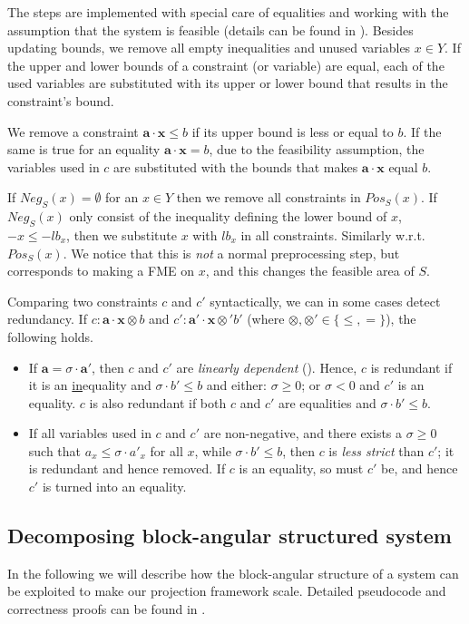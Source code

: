 \documentclass{llncs}
\newcommand{\Pos}{\mathit{Pos}}
\newcommand{\Neg}{\mathit{Neg}}
\newcommand{\ve}{\mathbf}
\newcounter{counterName}
\begin{document}
The steps are implemented with special care of equalities and working with the assumption that the system is feasible (details can be found in \cite{MyTechRep}).
Besides updating bounds, we remove all empty inequalities and unused variables $x\in Y$.  
%
If the upper and lower bounds of a constraint (or variable) are equal, each of the used variables are substituted with its upper or lower bound that results in the constraint's bound. 

%
We remove a constraint $\ve{a}\cdot \ve{x} \leq b$ if its upper bound 
is less or equal to $b$. 
If the same is true for an equality $\ve{a}\cdot \ve{x}=b$, due to the feasibility assumption, the variables used in $c$ are substituted with the bounds that makes $\ve{a}\cdot \ve{x}$ equal $b$. 


If $\Neg_S(x)=\emptyset$ for an $x\in Y$ 
then we remove all constraints in $\Pos_S(x)$. If $\Neg_S(x)$ only consist of the inequality defining the lower bound of $x$, $-x\leq -lb_x$, then we substitute $x$ with $lb_x$ in all constraints. Similarly w.r.t. $\Pos_S(x)$. We notice that this is \emph{not} a normal preprocessing step, but corresponds to making a FME on $x$, and this changes the feasible area of $S$. 

Comparing two constraints $c$ and $c'$ syntactically, we can in some cases detect redundancy. 
If $c:\ve{a}\cdot \ve{x}\otimes b$ and $c': \ve{a}'\cdot \ve{x}\otimes' b'$ (where $\otimes,\otimes'\in\{\leq,=\}$), the following holds.
\begin{itemize} \itemsep0em 
\setcounter{enumi}{\value{counterName}}
\item 
If $\ve{a}=\sigma\cdot \ve{a}'$, then $c$ and $c'$ are \emph{linearly dependent} (\cite{lassez93}). Hence, $c$ is redundant if
it is an \underline{in}equality and $\sigma\cdot b'\leq b$ and either: $\sigma\geq 0$; or $\sigma<0$ and $c'$ is an equality. $c$ is also redundant if both $c$ and $c'$ are equalities and $\sigma\cdot b'\leq b$. 
\item
If all variables used in $c$ and $c'$ are non-negative, and there exists a $\sigma\geq 0$ such that $a_x \leq \sigma \cdot a'_x$ for all $x$, while $\sigma\cdot b' \leq b$, then $c$ is \emph{less strict} than $c'$; it is redundant and hence removed. If $c$ is an equality, so must $c'$ be, and hence $c'$ is turned into an equality. 
\end{itemize} 
\subsection{Decomposing block-angular structured system}\label{sec:decomp}
In the following we will describe how the block-angular structure of a system can be exploited to make our projection framework scale. Detailed pseudocode and correctness proofs can be found in \cite{MyTechRep}. 
\end{document}
